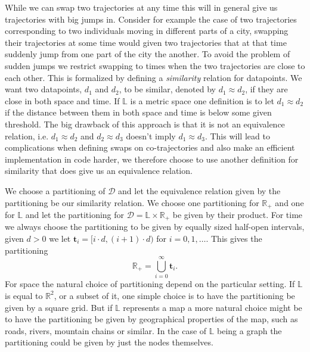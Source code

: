 \documentclass[12pt]{article}
\newcommand{\R}{\mathbb{R}}
\newcommand{\data}{d}
\newcommand{\locset}{\mathbb{L}}
\newcommand{\timeset}{\mathbb{R}_+}
\newcommand{\dataset}{\mathcal{D}}
\newcommand{\timint}{\mathbf{t}}
\theoremstyle{definition}
\begin{document}
While we can swap two trajectories at any time this will in general
give us trajectories with big jumps in. Consider for example the case
of two trajectories corresponding to two individuals moving in
different parts of a city, swapping their trajectories at some time
would given two trajectories that at that time suddenly jump from one
part of the city the another. To avoid the problem of sudden jumps we
restrict swapping to times when the two trajectories are close to each
other. This is formalized by defining a \emph{similarity} relation for
datapoints. We want two datapoints, \(\data_{1}\) and \(\data_{2}\),
to be similar, denoted by \(\data_{1} \approx \data_{2}\), if they are
close in both space and time. If \(\locset\) is a metric space one
definition is to let \(\data_{1} \approx \data_{2}\) if the distance
between them in both space and time is below some given threshold. The
big drawback of this approach is that it is not an equivalence
relation, i.e. \(\data_{1} \approx \data_{2}\) and
\(\data_{2} \approx \data_{3}\) doesn't imply
\(\data_{1} \approx \data_{3}\). This will lead to complications when
defining swaps on co-trajectories and also make an efficient
implementation in code harder, we therefore choose to use another
definition for similarity that does give us an equivalence relation.

We choose a partitioning of \(\dataset\) and let the equivalence
relation given by the partitioning be our similarity relation. We
choose one partitioning for \(\R_{+}\) and one for \(\locset\) and let
the partitioning for \(\dataset = \locset \times \R_{+}\) be given by
their product. For time we always choose the partitioning to be given
by equally sized half-open intervals, given \(d > 0\) we let
\(\timint_{i} = [i \cdot d, (i + 1) \cdot d)\) for
\(i = 0, 1, \dots\). This gives the partitioning
\begin{equation*}
  \timeset = \bigcup_{i = 0}^{\infty} \timint_{i}.
\end{equation*}
For space the natural choice of partitioning depend on the particular
setting. If \(\locset\) is equal to \(\R^{2}\), or a subset of it, one
simple choice is to have the partitioning be given by a square grid.
But if \(\locset\) represents a map a more natural choice might be to
have the partitioning be given by geographical properties of the map,
such as roads, rivers, mountain chains or similar. In the case of
\(\locset\) being a graph the partitioning could be given by just the
nodes themselves.
\end{document}
